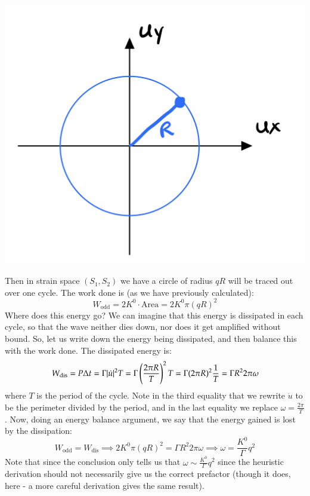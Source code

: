 \begin{center}
    \includegraphics[scale=0.35]{Lectures/Images/lec5-uxuyspace.png}
\end{center}

Then in strain space $(S_1, S_2)$ we have a circle of radius $qR$ will be traced out over one cycle. The work done is (as we have previously calculated):
\begin{equation}
    W_{\text{odd}} = 2K^0 \cdot \text{Area} = 2K^0\pi(qR)^2
\end{equation}
Where does this energy go? We can imagine that this energy is dissipated in each cycle, so that the wave neither dies down, nor does it get amplified without bound. So, let us write down the energy being dissipated, and then balance this with the work done. The dissipated energy is:
\begin{equation}
    W_{\text{dis}} = P\Delta t = \Gamma\lvert \dot{u} \rvert^2T = \Gamma\left(\frac{2\pi R}{T}\right)^2 T = \Gamma (2\pi R)^2 \frac{1}{T} = \Gamma R^2 2\pi \omega
\end{equation}
where $T$ is the period of the cycle. Note in the third equality that we rewrite $\dot{u}$ to be the perimeter divided by the period, and in the last equality we replace $\omega = \frac{2\pi}{T}$. Now, doing an energy balance argument, we say that the energy gained is lost by the dissipation:
\begin{equation}
    W_{\text{odd}} = W_{\text{dis}} \implies 2K^0\pi(qR)^2 = \Gamma R^2 2\pi \omega \implies \boxed{\omega = \frac{K^0}{\Gamma}q^2}
\end{equation}
Note that since the conclusion only tells us that $\omega \sim \frac{K^0}{\Gamma}q^2$ since the heuristic derivation should not necessarily give us the correct prefactor (though it does, here - a more careful derivation gives the same result). 

